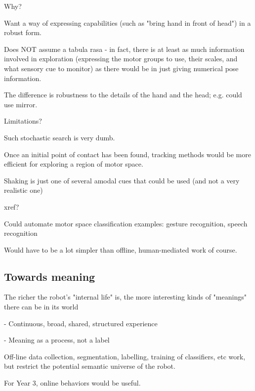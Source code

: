 Why?

Want a way of expressing capabilities (such as "bring hand in front of head") in a robust form.

Does NOT assume a tabula rasa - in fact, there is at least as much information involved in exploration (expressing the motor groups to use, their scales, and what sensory cue to monitor) as there would be in just giving numerical pose information.

The difference is robustness to the details of the hand and the head; e.g. could use mirror.

Limitations?

Such stochastic search is very dumb.

Once an initial point of contact has been found, tracking methods would be more efficient for exploring a region of motor space.

Shaking is just one of several amodal cues that could be used (and not a very realistic one)

xref?

Could automate motor space classification examples: gesture recognition, speech recognition

Would have to be a lot simpler than offline, human-mediated work of course.


\subsection{Towards meaning}

The richer the robot's "internal life" is, the more interesting kinds
of "meanings" there can be in its world

- Continuous, broad, shared, structured experience

- Meaning as a process, not a label

Off-line data collection, segmentation, labelling, training of
classifiers, etc work, but restrict the potential semantic universe of
the robot.

For Year 3, online behaviors would be useful.

